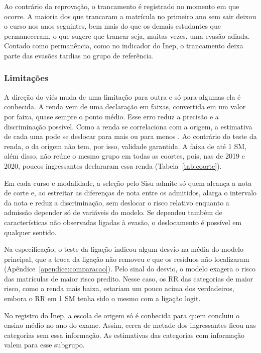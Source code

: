 \documentclass[12pt,a4paper]{article}
\begin{document}
Ao contrário da reprovação, o trancamento é registrado no momento em que ocorre. A maioria dos que trancaram a matrícula no primeiro ano sem sair deixou o curso nos anos seguintes, bem mais do que os demais estudantes que permaneceram, o que sugere que trancar seja, muitas vezes, uma evasão adiada. Contado como permanência, como no indicador do Inep, o trancamento deixa parte das evasões tardias no grupo de referência.

\subsubsection{Limitações}
\label{sec:disc-limitacoes}

A direção do viés muda de uma limitação para outra e só para algumas ela é conhecida. A renda vem de uma declaração em faixas, convertida em um valor por faixa, quase sempre o ponto médio. Esse erro reduz a precisão e a discriminação possível. Como a renda se correlaciona com a origem, a estimativa de cada uma pode se deslocar para mais ou para menos \citep{keogh2020stratos}. Ao contrário do teste da renda, o da origem não tem, por isso, validade garantida. A faixa de até 1 SM, além disso, não reúne o mesmo grupo em todas as coortes, pois, nas de 2019 e 2020, poucos ingressantes declararam essa renda (Tabela~\ref{tab:coorte}).

Em cada curso e modalidade, a seleção pelo Sisu admite só quem alcança a nota de corte e, ao estreitar as diferenças de nota entre os admitidos, alarga o intervalo da nota e reduz a discriminação, sem deslocar o risco relativo enquanto a admissão depender só de variáveis do modelo. Se dependeu também de características não observadas ligadas à evasão, o deslocamento é possível em qualquer sentido.

Na especificação, o teste da ligação indicou algum desvio na média do modelo principal, que a troca da ligação não removeu e que os resíduos não localizaram (Apêndice~\ref{apendice:comparacao}). Pelo sinal do desvio, o modelo exagera o risco das matrículas de maior risco predito. Nesse caso, os RR das categorias de maior risco, como a renda mais baixa, estariam um pouco acima dos verdadeiros, embora o RR em 1 SM tenha sido o mesmo com a ligação logit.

No registro do Inep, a escola de origem só é conhecida para quem concluiu o ensino médio no ano do exame. Assim, cerca de metade dos ingressantes ficou nas categorias sem essa informação. As estimativas das categorias com informação valem para esse subgrupo.
\end{document}
